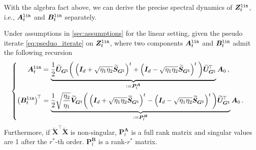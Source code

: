 With the algebra fact above, we can derive the precise spectral dynamics of $\bm Z^{\tt lin}_t$, i.e., $\bm A^{\tt lin}_t$ and $\bm B^{\tt lin}_t$ separately.
\begin{lemma}\label{psuedo-dynamics}
Under assumptions in \cref{sec:assumptions} for the linear setting, given the pseudo iterate \eqref{eq:pseduo_iterate} on $\bm Z^{\tt lin}_t$, where two components $\bm A^{\tt lin}_t$ and $\bm B^{\tt lin}_t$ admit the following recursion
    \begin{align*}
        \left\{\begin{aligned}
            \bm A^{\tt lin}_t & = \underbrace{\frac{1}{2}\widetilde{\bm U}_{\bm G^\natural}\bigg(\left(\bm I_d + \sqrt{\eta_1 \eta_2}\widetilde{\bm S}_{\bm G^\natural}\right)^t + \left(\bm I_d - \sqrt{\eta_1 \eta_2}\widetilde{\bm S}_{\bm G^\natural}\right)^t\bigg)\widetilde{\bm U}_{\bm G^\natural}^{\!\top}}_{:= \bm P_t^{\bm A}}\bm A_0\,,\\
            \left(\bm B^{\tt lin}_t\right)^{\!\top} & = \underbrace{\frac{1}{2}\sqrt{\frac{\eta_2}{\eta_1}}\widetilde{\bm V}_{\bm G^\natural}\bigg(\left(\bm I_d + \sqrt{\eta_1 \eta_2}\widetilde{\bm S}_{\bm G^\natural}\right)^t - \left(\bm I_d - \sqrt{\eta_1 \eta_2}\widetilde{\bm S}_{\bm G^\natural}\right)^t\bigg)\widetilde{\bm U}_{\bm G^\natural}^{\!\top}}_{:=\bm P_t^{\bm B}}\bm A_0\,.
        \end{aligned}\right.
    \end{align*}
    Furthermore, if $\widetilde{\bm X}^{\!\top}\widetilde{\bm X}$ is non-singular, $ \bm P_t^{\bm A}$ is a full rank matrix and singular values are 1 after the $r^*$-th order. $ \bm P_t^{\bm B}$ is a rank-$r^*$ matrix.
\end{lemma}

